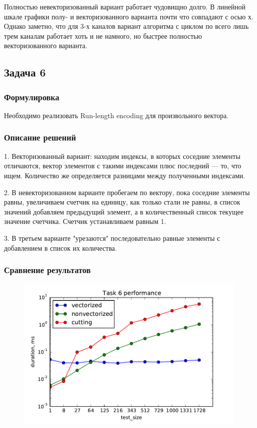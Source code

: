 \documentclass[12pt]{article}
\begin{document}
Полностью невекторизованный вариант работает чудовищно долго. В линейной шкале графики полу- и векторизованного варианта почти что совпадают с осью х. Однако заметно, что для 3-х каналов вариант алгоритма с циклом по всего лишь трем каналам работает хоть и не намного, но быстрее полностью векторизованного варианта.

\subsection{Задача 6}

\subsubsection*{Формулировка}

Необходимо реализовать Run-length encoding для произвольного вектора.

\subsubsection*{Описание решений}

1. Векторизованный вариант: находим индексы, в которых соседние элементы отличаются, вектор элементов с такими индексами плюс последний --- то, что ищем. Количество же определяется разницами между полученными индексами.

2. В невекторизованном варианте пробегаем по вектору, пока соседние элементы равны, увеличиваем счетчик на единицу, как только стали не равны, в список значений добавляем предыдущий элемент, а в количественный список текущее значение счетчика. Счетчик устанавливаем равным 1.

3. В третьем варианте "урезаются" последовательно равные элементы с добавлением в список их количества.

\newpage

\subsubsection*{Сравнение результатов}

\begin{figure}[h]
	\begin{center}
		\includegraphics[scale=0.7]{task6}
	\end{center}
\end{figure}
\end{document}
